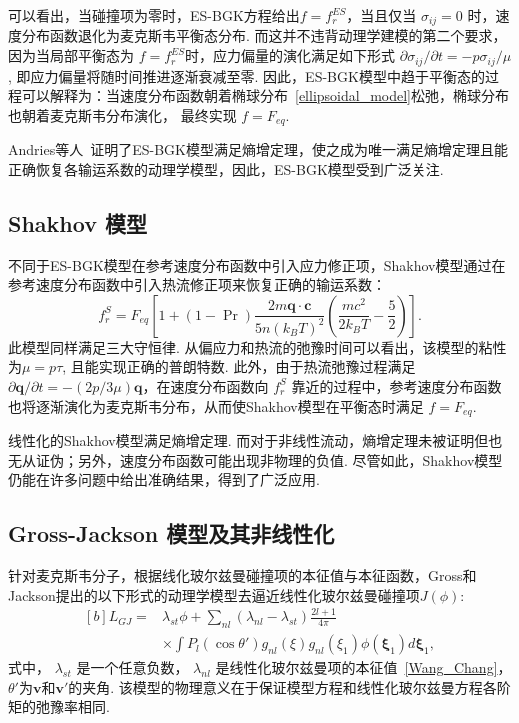 可以看出，当碰撞项为零时，ES-BGK方程给出$f=f_{r}^{ES}$，当且仅当 $\sigma_{ij}=0$ 时，速度分布函数退化为麦克斯韦平衡态分布. 而这并不违背动理学建模的第二个要求，因为当局部平衡态为 $f=f_{r}^{ES}$时，应力偏量的演化满足如下形式
$\partial \sigma_{ij}/{\partial t}=-{p}\sigma_{ij}/\mu$, 即应力偏量将随时间推进逐渐衰减至零. 因此，ES-BGK模型中趋于平衡态的过程可以解释为：当速度分布函数朝着椭球分布~\eqref{ellipsoidal_model}松弛，椭球分布也朝着麦克斯韦分布演化， 最终实现 $f=F_{eq}$. 


Andries等人~\cite{andries2000gaussian}证明了ES-BGK模型满足熵增定理，使之成为唯一满足熵增定理且能正确恢复各输运系数的动理学模型，因此，ES-BGK模型受到广泛关注. 




\subsection{Shakhov 模型}\label{shakhov_model_chapter}

不同于ES-BGK模型在参考速度分布函数中引入应力修正项，Shakhov模型通过在参考速度分布函数中引入热流修正项来恢复正确的输运系数：
\begin{equation}\label{smodel}
f_r^S=F_{eq}\left[1+(1-\operatorname{Pr})\frac{2m\bm{q}\cdot
	\bm{c}}{5n(k_BT)^2}\left(\frac{mc^2}{2k_BT}-\frac{5}{2}\right)\right].
\end{equation}
此模型同样满足三大守恒律. 从偏应力和热流的弛豫时间可以看出，该模型的粘性为$\mu=p\tau$, 且能实现正确的普朗特数. 
此外，由于热流弛豫过程满足 $\partial \bm{q}/\partial t=-(2p/3\mu)\bm{q}$，在速度分布函数向 $f_r^S$ 靠近的过程中，参考速度分布函数也将逐渐演化为麦克斯韦分布，从而使Shakhov模型在平衡态时满足 $f=F_{eq}$. 

线性化的Shakhov模型满足熵增定理. 而对于非线性流动，熵增定理未被证明但也无从证伪；另外，速度分布函数可能出现非物理的负值. 尽管如此，Shakhov模型仍能在许多问题中给出准确结果，得到了广泛应用. 



\subsection{Gross-Jackson 模型及其非线性化}\label{gross-jackson-model}

针对麦克斯韦分子，根据线化玻尔兹曼碰撞项的本征值与本征函数，Gross和Jackson提出的以下形式的动理学模型去逼近线性化玻尔兹曼碰撞项$J(\phi)$:
\begin{equation}\label{Gross_Jackson_original_0}
\begin{aligned}[b]
{L}_{GJ}=&\lambda_{st}\phi+\sum_{nl}(\lambda_{nl}-\lambda_{st})\frac{2l+1}{4\pi}\\
&\times\int{}P_l(\cos\theta')g_{nl}(\xi)g_{nl}(\xi_1)\phi(\bm{\xi}_1) d\bm{\xi}_1,
\end{aligned}
\end{equation}
式中， $\lambda_{st}$ 是一个任意负数， $\lambda_{nl}$ 是线性化玻尔兹曼项的本征值~\eqref{Wang_Chang}，$\theta'$为$\bm{v}$和$\bm{v}'$的夹角. 该模型的物理意义在于保证模型方程和线性化玻尔兹曼方程各阶矩的弛豫率相同. 


